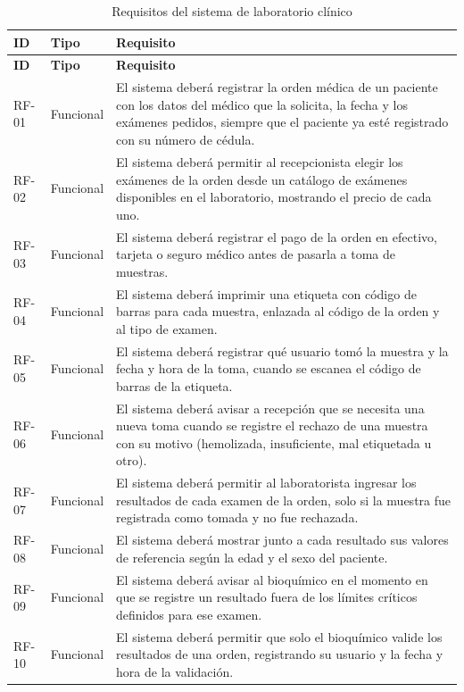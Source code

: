 \documentclass[11pt,a4paper]{article}
\begin{document}
\begin{longtable}{|L{1.5cm}|L{2.6cm}|L{11.0cm}|}
\caption{Requisitos del sistema de laboratorio clínico}\label{tab:requisitos}\\
\hline
\textbf{ID} & \textbf{Tipo} & \textbf{Requisito}\\
\hline
\endfirsthead
\hline
\textbf{ID} & \textbf{Tipo} & \textbf{Requisito}\\
\hline
\endhead
RF-01 & Funcional & El sistema deberá registrar la orden médica de un paciente con los datos del médico que la solicita, la fecha y los exámenes pedidos, siempre que el paciente ya esté registrado con su número de cédula.\\
\hline
RF-02 & Funcional & El sistema deberá permitir al recepcionista elegir los exámenes de la orden desde un catálogo de exámenes disponibles en el laboratorio, mostrando el precio de cada uno.\\
\hline
RF-03 & Funcional & El sistema deberá registrar el pago de la orden en efectivo, tarjeta o seguro médico antes de pasarla a toma de muestras.\\
\hline
RF-04 & Funcional & El sistema deberá imprimir una etiqueta con código de barras para cada muestra, enlazada al código de la orden y al tipo de examen.\\
\hline
RF-05 & Funcional & El sistema deberá registrar qué usuario tomó la muestra y la fecha y hora de la toma, cuando se escanea el código de barras de la etiqueta.\\
\hline
RF-06 & Funcional & El sistema deberá avisar a recepción que se necesita una nueva toma cuando se registre el rechazo de una muestra con su motivo (hemolizada, insuficiente, mal etiquetada u otro).\\
\hline
RF-07 & Funcional & El sistema deberá permitir al laboratorista ingresar los resultados de cada examen de la orden, solo si la muestra fue registrada como tomada y no fue rechazada.\\
\hline
RF-08 & Funcional & El sistema deberá mostrar junto a cada resultado sus valores de referencia según la edad y el sexo del paciente.\\
\hline
RF-09 & Funcional & El sistema deberá avisar al bioquímico en el momento en que se registre un resultado fuera de los límites críticos definidos para ese examen.\\
\hline
RF-10 & Funcional & El sistema deberá permitir que solo el bioquímico valide los resultados de una orden, registrando su usuario y la fecha y hora de la validación.\\

\end{longtable}
\end{document}
